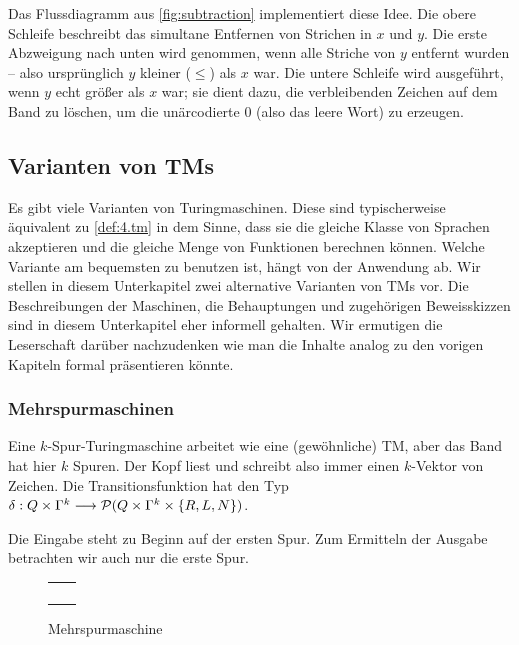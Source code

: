 \begin{Bsp}
	Das Flussdiagramm aus \autoref{fig:subtraction} implementiert diese Idee.
	Die obere Schleife beschreibt das simultane Entfernen von Strichen in $x$ und $y$.
	Die erste Abzweigung nach unten wird genommen, wenn alle Striche von $y$ entfernt wurden -- also ursprünglich $y$ kleiner ($\leq$) als $x$ war.
	Die untere Schleife wird ausgeführt, wenn $y$ echt größer als $x$ war; sie dient dazu, die verbleibenden Zeichen auf dem Band zu löschen,
	um die unärcodierte $0$ (also das leere Wort) zu erzeugen.
\end{Bsp}
  
\subsection{Varianten von \texorpdfstring{\ac{TM}}{TM}s}
Es gibt viele Varianten von Turingmaschinen.
Diese sind typischerweise äquivalent zu \autoref{def:4.tm} in dem Sinne, dass sie die gleiche Klasse von Sprachen akzeptieren und die gleiche Menge von Funktionen berechnen können.
Welche Variante am bequemsten zu benutzen ist, hängt von der Anwendung ab.
Wir stellen in diesem Unterkapitel zwei alternative Varianten von TMs vor.
Die Beschreibungen der Maschinen, die Behauptungen und zugehörigen Beweisskizzen sind in diesem Unterkapitel eher informell gehalten.
Wir ermutigen die Leserschaft darüber nachzudenken wie man die Inhalte analog zu den vorigen Kapiteln formal präsentieren könnte.


\subsubsection{Mehrspurmaschinen}
Eine $k$-Spur-Turingmaschine arbeitet wie eine (gewöhnliche) \ac{TM}, aber das Band hat hier $k$ Spuren.
Der Kopf liest und schreibt also immer einen $k$-Vektor von Zeichen.
Die Transitionsfunktion hat den Typ $\delta: Q\times\Gamma^k\--> \Powerset(Q\times\Gamma^k\times\{R,L,N\})$.

Die Eingabe steht zu Beginn auf der ersten Spur.
Zum Ermitteln der Ausgabe betrachten wir auch nur die erste Spur.

	\begin{figure}[H]\centering
		{\renewcommand{\arraystretch}{0.8}
		\begin{tabu} to .5\textwidth {X[.35]|X[.65]}
			&\\\hline
			&\\\hline
			&\\\hline
			&\\\hline
			&
		\end{tabu}}
		\caption{Mehrspurmaschine}
	\end{figure}


